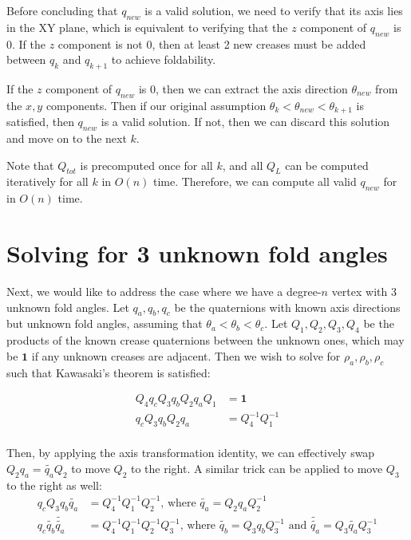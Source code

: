 \documentclass[11pt]{article}
\begin{document}
Before concluding that $q_{new}$ is a valid solution, we need to verify that its axis lies in the XY plane, which is equivalent to verifying that the $z$ component of $q_{new}$ is $0$. If the $z$ component is not $0$, then at least 2 new creases must be added between $q_k$ and $q_{k+1}$ to achieve foldability. 

If the $z$ component of $q_{new}$ is $0$, then we can extract the axis direction $\theta_{new}$ from the $x,y$ components. Then if our original assumption $\theta_k < \theta_{new} < \theta_{k+1}$ is satisfied, then $q_{new}$ is a valid solution. If not, then we can discard this solution and move on to the next $k$.

Note that $Q_{tot}$ is precomputed once for all $k$, and all $Q_L$ can be computed iteratively for all $k$ in $O(n)$ time. Therefore, we can compute all valid $q_{new}$ for in $O(n)$ time.

\section{Solving for 3 unknown fold angles}
Next, we would like to address the case where we have a degree-$n$ vertex with 3 unknown fold angles. Let $q_a, q_b, q_c$ be the quaternions with known axis directions but unknown fold angles, assuming that $\theta_a < \theta_b < \theta_c$. Let $Q_1, Q_2, Q_3, Q_4$ be the products of the known crease quaternions between the unknown ones, which may be $\mathbf{1}$ if any unknown creases are adjacent. Then we wish to solve for $\rho_a, \rho_b, \rho_c$ such that Kawasaki's theorem is satisfied:

\begin{align}
    Q_4 q_c Q_3 q_b Q_2 q_a Q_1 &= \mathbf{1}\\
    q_c Q_3 q_b Q_2 q_a &= Q_4^{-1} Q_1^{-1} \\
\end{align}

Then, by applying the axis transformation identity, we can effectively swap $Q_2 q_a = \tilde{q_a} Q_2$ to move $Q_2$ to the right. A similar trick can be applied to move $Q_3$ to the right as well:
\begin{align}
    q_c Q_3 q_b \tilde{q_a} &= Q_4^{-1} Q_1^{-1} Q_2^{-1} \text{, where } \tilde{q_a} = Q_2 q_a Q_2^{-1} \\
    q_c \tilde{q_b} \tilde{\tilde{q_a}} &= Q_4^{-1} Q_1^{-1} Q_2^{-1} Q_3^{-1} \text{, where } \tilde{q_b} = Q_3 q_b Q_3^{-1} \text{ and } \tilde{\tilde{q_a}} = Q_3 \tilde{q_a} Q_3^{-1}
\end{align}
\end{document}
